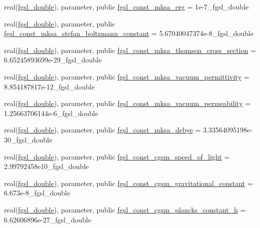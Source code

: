 \begin{DoxyCompactItemize}
real(\hyperlink{namespacefgsl_a9af5113378e0f000eb479d3f90196ddf}{fgsl\+\_\+double}), parameter, public \hyperlink{namespacefgsl_a7135370afba011fa6c30a3028af76f15}{fgsl\+\_\+const\+\_\+mksa\+\_\+erg} = 1e-\/7\+\_\+fgsl\+\_\+double
\item 
real(\hyperlink{namespacefgsl_a9af5113378e0f000eb479d3f90196ddf}{fgsl\+\_\+double}), parameter, public \hyperlink{namespacefgsl_a730c5b5646585a81247eaa92703505da}{fgsl\+\_\+const\+\_\+mksa\+\_\+stefan\+\_\+boltzmann\+\_\+constant} = 5.\+67040047374e-\/8\+\_\+fgsl\+\_\+double
\item 
real(\hyperlink{namespacefgsl_a9af5113378e0f000eb479d3f90196ddf}{fgsl\+\_\+double}), parameter, public \hyperlink{namespacefgsl_a6db1579c2961f86ba36e1ec23eea34cf}{fgsl\+\_\+const\+\_\+mksa\+\_\+thomson\+\_\+cross\+\_\+section} = 6.\+65245893699e-\/29\+\_\+fgsl\+\_\+double
\item 
real(\hyperlink{namespacefgsl_a9af5113378e0f000eb479d3f90196ddf}{fgsl\+\_\+double}), parameter, public \hyperlink{namespacefgsl_a74a2728881184d5037b397e55d24411d}{fgsl\+\_\+const\+\_\+mksa\+\_\+vacuum\+\_\+permittivity} = 8.\+854187817e-\/12\+\_\+fgsl\+\_\+double
\item 
real(\hyperlink{namespacefgsl_a9af5113378e0f000eb479d3f90196ddf}{fgsl\+\_\+double}), parameter, public \hyperlink{namespacefgsl_a16aee30f6ddf44068a051e80be1f1e0e}{fgsl\+\_\+const\+\_\+mksa\+\_\+vacuum\+\_\+permeability} = 1.\+25663706144e-\/6\+\_\+fgsl\+\_\+double
\item 
real(\hyperlink{namespacefgsl_a9af5113378e0f000eb479d3f90196ddf}{fgsl\+\_\+double}), parameter, public \hyperlink{namespacefgsl_ad4022c36598c9b49cb3bc9497fcdc06c}{fgsl\+\_\+const\+\_\+mksa\+\_\+debye} = 3.\+33564095198e-\/30\+\_\+fgsl\+\_\+double
\item 
real(\hyperlink{namespacefgsl_a9af5113378e0f000eb479d3f90196ddf}{fgsl\+\_\+double}), parameter, public \hyperlink{namespacefgsl_a5b4812e235747b48af51d2e576dfa469}{fgsl\+\_\+const\+\_\+cgsm\+\_\+speed\+\_\+of\+\_\+light} = 2.\+99792458e10\+\_\+fgsl\+\_\+double
\item 
real(\hyperlink{namespacefgsl_a9af5113378e0f000eb479d3f90196ddf}{fgsl\+\_\+double}), parameter, public \hyperlink{namespacefgsl_a9f255e9dfccd5852a1229344cadc48ba}{fgsl\+\_\+const\+\_\+cgsm\+\_\+gravitational\+\_\+constant} = 6.\+673e-\/8\+\_\+fgsl\+\_\+double
\item 
real(\hyperlink{namespacefgsl_a9af5113378e0f000eb479d3f90196ddf}{fgsl\+\_\+double}), parameter, public \hyperlink{namespacefgsl_ace25c1aaa228a6b88d1f8e8ad1811cc5}{fgsl\+\_\+const\+\_\+cgsm\+\_\+plancks\+\_\+constant\+\_\+h} = 6.\+62606896e-\/27\+\_\+fgsl\+\_\+double

\end{DoxyCompactItemize}
